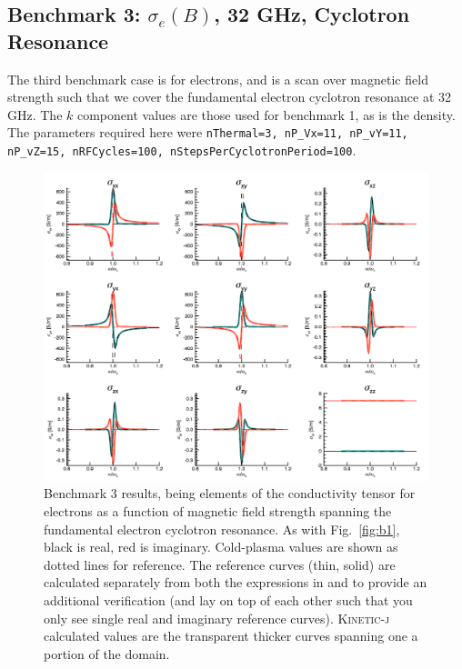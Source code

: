 \documentclass[final,5p,times,twocolumn]{elsarticle}
\newcounter{bla}
\newcommand{\kj}{\textsc{Kinetic-j}\xspace}
\begin{document}
\subsection{Benchmark 3: $\sigma_e\left(B\right)$, 32 GHz, Cyclotron Resonance}
\label{section:verification3}
%
The third benchmark case is for electrons, and is a scan over magnetic field strength such that we cover the fundamental electron cyclotron resonance at 32 GHz. The $k$ component values are those used for benchmark 1, as is the density. The parameters required here were \texttt{nThermal=3, nP\_Vx=11, nP\_vY=11, nP\_vZ=15, nRFCycles=100, nStepsPerCyclotronPeriod=100}.
%
\begin{figure}
\centering
\includegraphics[]{figures/benchmark3}
\caption{Benchmark 3 results, being elements of the conductivity tensor for electrons as a function of magnetic field strength spanning the fundamental electron cyclotron resonance. As with Fig.~\ref{fig:b1}, black is real, red is imaginary. Cold-plasma values are shown as dotted lines for reference. The reference curves (thin, solid) are calculated separately from both the expressions in \cite{brambilla} and \cite{swanson} to provide an additional verification (and lay on top of each other such that you only see single real and imaginary reference curves). \kj calculated values are the transparent thicker curves spanning one a portion of the domain.}
\label{fig:b3}
\end{figure}
%
\end{document}
